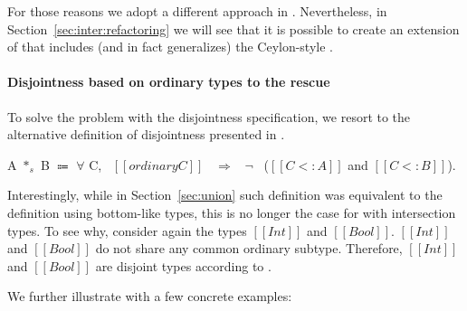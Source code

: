 For those reasons we adopt a different approach in \name.
Nevertheless, in Section~\ref{sec:inter:refactoring} we will see that it is possible to
create an extension of \name that includes (and in fact generalizes)
the Ceylon-style .

\paragraph{Disjointness based on ordinary types to the rescue}
To solve the problem with the disjointness specification, we resort to
the alternative definition of disjointness presented in .

\begin{definition}
\label{def:inter:disj}
  A $*_s$ B $\Coloneqq$ $\forall$ C, \ $[[ordinary C]]$ \ $\Longrightarrow$ \ $\neg$ \ ($[[C <: A]]$ and $[[C <: B]]$).
\end{definition}

Interestingly, while in Section~\ref{sec:union} such definition was
equivalent to the definition using bottom-like types, this is no
longer the case for \name with intersection types. To see why,
consider again the types $[[Int]]$ and $[[Bool]]$.  $[[Int]]$ and
$[[Bool]]$ do not share any common ordinary subtype. Therefore,
$[[Int]]$ and $[[Bool]]$ are disjoint types according to
.
\begin{comment}
We extend our previous example of type $[[Int]]$ and type $[[Bool]]$ and show how
disjointness based upon ordinary types categorize them as disjoint types.
An important observation at this point is common subtypes of type $[[Int]]$ and type $[[Bool]]$
cannot include either $[[Int]]$ or $[[Bool]]$. Problematic types are the intersection types
such as $[[Int /\ Bool]]$. We empahsize the point that ordinary types in \cal does not contain
intersection types. Further, all ordinary types are non-overlapping in \cal.
Therefore, now we say that
two types are disjoint if they do not have any common ordinary subtype. $[[Int]]$ and $[[Bool]]$
do not share any common ordinary subtype. Therefore, $[[Int]]$ and $[[Bool]]$ are disjoint types.
\Cref{def:inter:disj} shows the declarative disjointness for \cal with intersection types:


\noindent Two types $[[A]]$ and $[[B]]$ are
disjoint if the two types $[[A /\ B]]$ do
not have any common ordinary subtype. For example, $[[Int]]$ and $[[A -> B]]$
are disjoint types because there is no ordinary type that is a subtype
of both types ($[[Int]]$ and $[[A -> B]]$).
\Cref{def:inter:disj} is the same as 
\Cref{def:union:disj1}. However, while the \Cref{def:union:disj1} in \Cref{sec:union:discussion}
is equivalent the definition of disjointness using bottom-like types (\Cref{def:union:disj}),
in the calculus with intersection types that is no longer the case.
\end{comment}
We further illustrate  
 with a few concrete examples:

